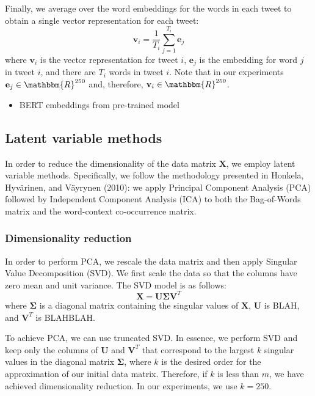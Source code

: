 \documentclass{article}
\begin{document}
Finally, we average over the word embeddings for the words in each tweet
to obtain a single vector representation for each tweet:
\[\mathbf{v}_i=\frac {1} {T_i} \sum_{j=1}^{T_i}{\mathbf{e}_j}\] where
\(\mathbf{v}_i\) is the vector representation for tweet \(i\),
\(\mathbf{e}_j\) is the embedding for word \(j\) in tweet \(i\), and
there are \(T_i\) words in tweet \(i\). Note that in our experiments
\(\mathbf{e}_j \in \mathbbm{R}^{250}\) and, therefore,
\(\mathbf{v}_i \in \mathbbm{R}^{250}\).

\begin{itemize}
\tightlist
\item
  BERT embeddings from pre-trained model
\end{itemize}

\hypertarget{latent-variable-methods}{%
\subsection{Latent variable methods}\label{latent-variable-methods}}

In order to reduce the dimensionality of the data matrix \(\mathbf{X}\),
we employ latent variable methods. Specifically, we follow the
methodology presented in Honkela, Hyvärinen, and Väyrynen (2010): we
apply Principal Component Analysis (PCA) followed by Independent
Component Analysis (ICA) to both the Bag-of-Words matrix and the
word-context co-occurrence matrix.

\hypertarget{dimensionality-reduction}{%
\subsubsection{Dimensionality
reduction}\label{dimensionality-reduction}}

In order to perform PCA, we rescale the data matrix and then apply
Singular Value Decomposition (SVD). We first scale the data so that the
columns have zero mean and unit variance. The SVD model is as follows:
\[\mathbf{X = U \Sigma V}^T\] where \(\mathbf{\Sigma}\) is a diagonal
matrix containing the singular values of \(\mathbf{X}\), \(\mathbf{U}\)
is BLAH, and \(\mathbf{V}^T\) is BLAHBLAH.

To achieve PCA, we can use truncated SVD. In essence, we perform SVD and
keep only the columns of \(\mathbf{U}\) and \(\mathbf{V}^T\) that
correspond to the largest \(k\) singular values in the diagonal matrix
\(\mathbf{\Sigma}\), where \(k\) is the desired order for the
approximation of our initial data matrix. Therefore, if \(k\) is less
than \(m\), we have achieved dimensionality reduction. In our
experiments, we use \(k = 250\).
\end{document}
